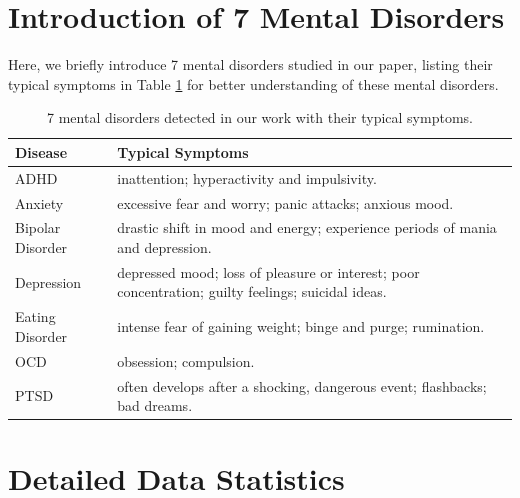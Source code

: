 \section{Introduction of 7 Mental Disorders}
\label{apd:dis_intro}
Here, we briefly introduce 7 mental disorders studied in our paper, listing their typical symptoms in Table \ref{tab:disease_intro} for better understanding of these mental disorders.

\begin{table}[h]
    \small
    \centering
    \begin{tabular}{m{2.2cm}|m{4cm}}
    \hline
    Disease          & Typical Symptoms \\
    \hline
    ADHD             & inattention; hyperactivity and impulsivity.         \\
    \hline
    Anxiety          &  excessive fear and worry; panic attacks; anxious mood.       \\
    \hline
    Bipolar Disorder & drastic shift in mood and energy; experience periods of mania and depression.        \\
    \hline
    Depression       &  depressed mood; loss of pleasure or interest; poor concentration; guilty feelings; suicidal ideas.      \\
    \hline
    Eating Disorder  &  intense fear of gaining weight; binge and purge; rumination.         \\
    \hline
    OCD              & obsession; compulsion.         \\
    \hline
    PTSD             &  often develops after a shocking, dangerous event; flashbacks; bad dreams.        \\
    \hline
    \end{tabular}
    \caption{7 mental disorders detected in our work with their typical symptoms.}
    \label{tab:disease_intro}
\end{table}


\section{Detailed Data Statistics}
\label{apd:stats}

